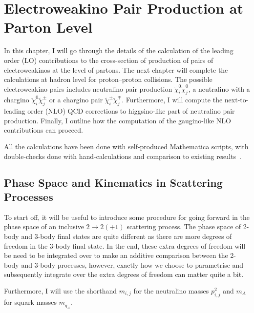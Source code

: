 \documentclass[../main.tex]{subfiles}
\begin{document}
\chapter{Electroweakino Pair Production at Parton Level}
\label{chap:part:parton_calculation}
In this chapter, I will go through the details of the calculation of the leading order (LO) contributions to the cross-section of production of pairs of electroweakinos at the level of partons.
The next chapter will complete the calculations at hadron level for proton--proton collisions.
The possible electroweakino pairs includes neutralino pair production \(\tilde\chi^0_i \tilde\chi^0_j\), a neutralino with a chargino \(\tilde\chi^0_i \tilde\chi^\pm_j\) or a chargino pair \(\tilde\chi^\pm_i \tilde\chi^\mp_j\).
Furthermore, I will compute the next-to-leading order (NLO) QCD corrections to higgsino-like part of neutralino pair production.
Finally, I outline how the computation of the gaugino-like NLO contributions can proceed.

All the calculations have been done with self-produced Mathematica scripts, with double-checks done with hand-calculations and comparison to existing results~\cite{Debove:2010kf}.
\\


\section{Phase Space and Kinematics in Scattering Processes}
To start off, it will be useful to introduce some procedure for going forward
in the phase space of an inclusive \(2\to 2(+1)\) scattering process.
The phase space of 2-body and 3-body final states are quite different as there are
more degrees of freedom in the 3-body final state.
In the end, these extra degrees of freedom will be need to be integrated over to make an additive
comparison between the 2-body and 3-body processes, however, exactly how we
choose to parametrise and subsequently integrate over the extra degrees of
freedom can matter quite a bit.
\medskip

Furthermore, I will use the shorthand \(m_{i,j}\) for the neutralino masses \(p_{i,j}^2\) and \(m_A\) for squark masses \(m_{\tilde{q}_A}\).
\end{document}
